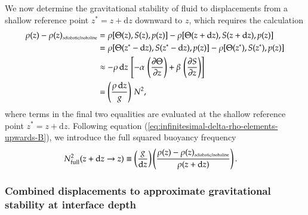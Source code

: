 We now determine the gravitational stability of fluid to displacements
from a shallow reference point $z^{*} = z + \mathrm{d}z$ downward to
$z$, which requires the calculation
\begin{equation}
\begin{split}
\rho(z)  - \rho(z)_{\mbox{\tiny adiabatic/isohaline}}  
&= 
 \rho[ \Theta(z), S(z), p(z)]
-
\rho[ \Theta(z+\mathrm{d}z), S(z+\mathrm{d}z), p(z)]
\\
 &=
 \rho[ \Theta(z^{*}-\mathrm{d}z), S(z^{*}-\mathrm{d}z), p(z)]
-
\rho[ \Theta(z^{*}), S(z^{*}), p(z)]
\\
&\approx 
 -\rho \, \mathrm{d}z \, \left[ 
   -\alpha \, \left( \frac{\partial \Theta}{\partial z} \right )
  + \beta \, \left( \frac{\partial S}{\partial z} \right) \right]
 \\
&=
\left( \frac{\rho \, \mathrm{d}z}{g} \right) \, N^{2},
\end{split}
\label{eq:infinitesimal-delta-rho-elements-downward}
\end{equation}
where terms in the final two equalities are evaluated at the shallow
reference point $z^{*} = z + \mathrm{d}z$.  Following equation
(\ref{eq:infinitesimal-delta-rho-elements-upwards-B}), we introduce the
full squared buoyancy frequency
\begin{equation}
\begin{split}
 N^{2}_{\mbox{\scriptsize full}}(z +\mathrm{d}z \rightarrow z) &\equiv 
 \left( \frac{g}{\mathrm{d}z} \right) 
 \left( \frac{\rho(z)  - \rho(z)_{\mbox{\tiny adiabatic/isohaline}} } {\rho(z+\mathrm{d}z) } \right).
\end{split}
\label{eq:infinitesimal-delta-rho-elements-downwards}
\end{equation}



\subsubsection{Combined displacements to approximate gravitational stability at
  interface depth}

